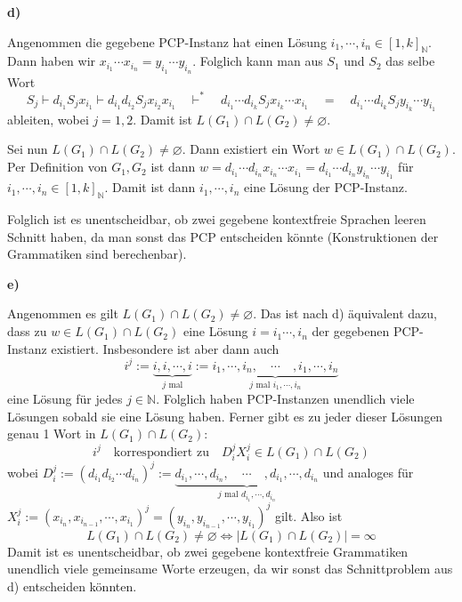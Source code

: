 \documentclass[a4paper,graphics,11pt]{article}
\begin{document}
\strut

\textbf{d)}

Angenommen die gegebene PCP-Instanz hat einen Lösung $i_1,\cdots,i_n \in [1,k]_\mathbb{N}$.\\
Dann haben wir $x_{i_1}\cdots x_{i_n} = y_{i_1} \cdots y_{i_n}$. Folglich kann man aus $S_1$ und $S_2$
das selbe Wort
$$
    S_j
    \vdash d_{i_1}S_jx_{i_1}
    \vdash d_{i_1}d_{i_2}S_jx_{i_2}x_{i_1}\quad
    \vdash^*\quad d_{i_1}\cdots d_{i_k}S_jx_{i_k}\cdots x_{i_1}
    \quad=\quad d_{i_1}\cdots d_{i_k}S_j y_{i_k}\cdots y_{i_1}
$$
ableiten, wobei $j=1,2$. Damit ist $L(G_1) \cap L(G_2) \neq \varnothing$.

Sei nun $L(G_1) \cap L(G_2) \neq \varnothing$. Dann existiert ein Wort $w \in L(G_1) \cap L(G_2)$.
Per Definition von $G_1,G_2$ ist dann
$w = d_{i_1}\cdots d_{i_n}x_{i_n}\cdots x_{i_1} = d_{i_1}\cdots d_{i_n}y_{i_n}\cdots y_{i_1}$ für
$i_1,\cdots,i_n \in [1,k]_\mathbb{N}$. Damit ist dann $i_1,\cdots,i_n$ eine Lösung der PCP-Instanz.

Folglich ist es unentscheidbar, ob zwei gegebene kontextfreie Sprachen leeren Schnitt haben, da
man sonst das PCP entscheiden könnte (Konstruktionen der Grammatiken sind berechenbar).

\newpage

\textbf{e)}

Angenommen es gilt $L(G_1) \cap L(G_2) \neq \varnothing$. Das ist nach d) äquivalent dazu, dass
zu $w \in L(G_1) \cap L(G_2)$ eine Lösung $i = i_1\cdots,i_n$ der gegebenen PCP-Instanz existiert.
Insbesondere ist aber dann auch
$$
    i^j
    := \underbrace{i,i,\cdots,i}_{j \text{ mal}}
    := \underbrace{i_1,\cdots,i_n,\quad\cdots\quad,i_1,\cdots,i_n}_{j \text{ mal } i_1,\cdots,i_n}
$$
eine Lösung für jedes $j \in \mathbb{N}$. Folglich haben PCP-Instanzen unendlich viele Lösungen
sobald sie eine Lösung haben. Ferner gibt es zu jeder dieser Lösungen genau 1 Wort in $L(G_1) \cap L(G_2)$:
$$
    i^j
    \quad\text{korrespondiert zu}\quad
    D_i^jX_i^j \in L(G_1) \cap L(G_2)
$$
wobei $D_i^j := (d_{i_1}d_{i_2}\cdots d_{i_n})^j
:= \underbrace{d_{i_1},\cdots,d_{i_n},\quad\cdots\quad,d_{i_1},\cdots,d_{i_n}}_{j \text{ mal } d_{i_1},\cdots,d_{i_n}}$
und analoges für\\
$X_i^j := (x_{i_n},x_{i_{n-1}},\cdots,x_{i_1})^j = (y_{i_n},y_{i_{n-1}},\cdots,y_{i_1})^j$ gilt.
Also ist
$$
    L(G_1) \cap L(G_2) \neq \varnothing \iff |L(G_1) \cap L(G_2)| = \infty
$$
Damit ist es unentscheidbar, ob zwei gegebene kontextfreie Grammatiken unendlich viele gemeinsame Worte erzeugen,
da wir sonst das Schnittproblem aus d) entscheiden könnten.
\end{document}
